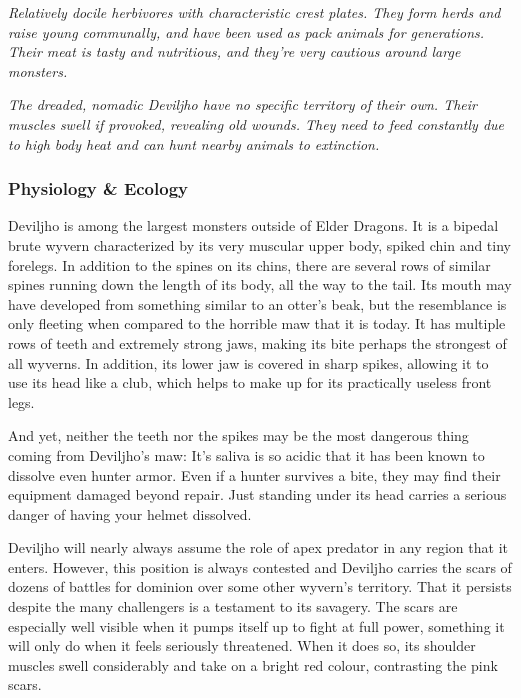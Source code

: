 \textit{Relatively docile herbivores with characteristic crest plates. They form herds and raise young communally, and have been used as pack animals for generations. Their meat is tasty and nutritious, and they're very cautious around large monsters.}

\textit{The dreaded, nomadic Deviljho have no specific territory of their own. Their muscles swell if provoked, revealing old wounds. They need to feed constantly due to high body heat and can hunt nearby animals to extinction.}%

\subsubsection{Physiology \& Ecology}
Deviljho is among the largest monsters outside of Elder Dragons. It is a bipedal brute wyvern characterized by its very muscular upper body, spiked chin and tiny forelegs. In addition to the spines on its chins, there are several rows of similar spines running down the length of its body, all the way to the tail. Its mouth may have developed from something similar to an otter's beak, but the resemblance is only fleeting when compared to the horrible maw that it is today. It has multiple rows of teeth and extremely strong jaws, making its bite perhaps the strongest of all wyverns. In addition, its lower jaw is covered in sharp spikes, allowing it to use its head like a club, which helps to make up for its practically useless front legs.

And yet, neither the teeth nor the spikes may be the most dangerous thing coming from Deviljho's maw: It's saliva is so acidic that it has been known to dissolve even hunter armor. Even if a hunter survives a bite, they may find their equipment damaged beyond repair. Just standing under its head carries a serious danger of having your helmet dissolved.

Deviljho will nearly always assume the role of apex predator in any region that it enters. However, this position is always contested and Deviljho carries the scars of dozens of battles for dominion over some other wyvern's territory. That it persists despite the many challengers is a testament to its savagery. The scars are especially well visible when it pumps itself up to fight at full power, something it will only do when it feels seriously threatened. When it does so, its shoulder muscles swell considerably and take on a bright red colour, contrasting the pink scars.

